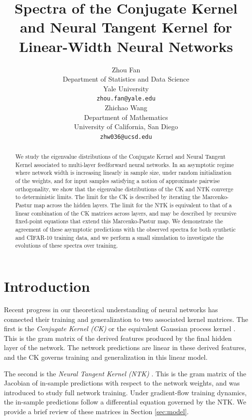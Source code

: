 \documentclass{article}
\title{Spectra of the Conjugate Kernel and Neural Tangent Kernel for
	Linear-Width Neural Networks}
\author{%
	Zhou Fan\\
	Department of Statistics and Data Science\\
	Yale University\\
	\texttt{zhou.fan@yale.edu}\\
	\And
	Zhichao Wang\\
	Department of Mathematics\\
	University of California, San Diego\\
	\texttt{zhw036@ucsd.edu}\\
}
\theoremstyle{definition}
\newcommand{\1}{\mathbf{1}}
\begin{document}
	
\maketitle

\begin{abstract}
We study the eigenvalue distributions of the Conjugate Kernel and Neural
Tangent Kernel associated to multi-layer feedforward neural networks. In an
asymptotic regime where network width is increasing linearly in sample size,
under random initialization of the weights, and for input samples
satisfying a notion of approximate pairwise orthogonality, we show that the
eigenvalue distributions of the CK and NTK converge to deterministic limits. The
limit for the CK is described by iterating the Marcenko-Pastur map across the
hidden layers. The limit for the NTK is equivalent to that of a linear
combination of the CK matrices across layers, and may be described by
recursive fixed-point equations that extend this Marcenko-Pastur map.
We demonstrate the agreement of these asymptotic predictions with the observed
spectra for both synthetic and CIFAR-10 training data, and we perform a small
simulation to investigate the evolutions of these spectra over training.
\end{abstract}

\section{Introduction}\label{sec:introduction}

Recent progress in our theoretical understanding of neural networks has
connected their training and generalization to
two associated kernel matrices. The first is the \emph{Conjugate Kernel (CK)}
or the equivalent Gaussian process kernel
\cite{neal1995bayesian,williams1997computing,cho2009kernel,daniely2016toward,poole2016exponential,schoenholz2017deep,lee2018deep,matthews2018gaussian}.
This is the gram matrix of the derived features produced by the
final hidden layer of the network. The network predictions are linear in
these derived features, and the CK governs
training and generalization in this linear model.

The second is the \emph{Neural Tangent Kernel (NTK)}
\cite{jacot2018neural,du2019gradienta,allen2019convergence}.
This is the gram matrix of the Jacobian of in-sample predictions with
respect to the network weights, and was introduced to study full network
training. Under gradient-flow training dynamics, the in-sample predictions 
follow a differential equation governed by the NTK. We provide a brief
review of these matrices in Section \ref{sec:model}.
\end{document}
